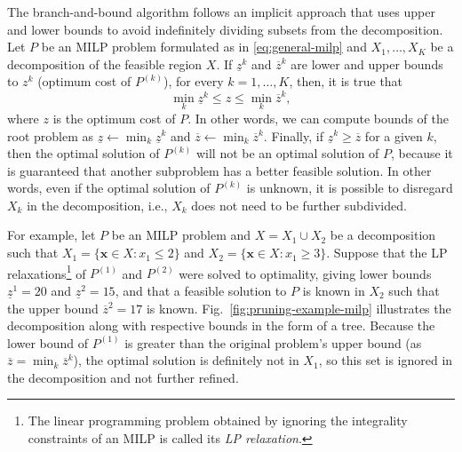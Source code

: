 The branch-and-bound algorithm follows an implicit approach that uses upper and lower bounds to avoid indefinitely dividing subsets from the decomposition.
Let $P$ be an MILP problem formulated as in \eqref{eq:general-milp} and $X_1,\ldots,X_K$ be a decomposition of the feasible region $X$.
If $\underline{z}^{k}$ and $\overline{z}^{k}$ are lower and upper bounds to $z^{k}$ (optimum cost of $P^{(k)}$), for every $k=1,\ldots,K$, then, it is true that \[
\min_k \underline{z}^{k} \le z \le \min_k \overline{z}^{k}
,\] 
where $z$ is the optimum cost of $P$.
In other words, we can compute bounds of the root problem as $\underline{z}\gets \min_k \underline{z}^{k}$ and $\overline{z}\gets \min_k \overline{z}^{k}$.
Finally, if $\underline{z}^{k} \ge \overline{z}$ for a given $k$, then the optimal solution of $P^{(k)}$ will not be an optimal solution of $P$, because it is guaranteed that another subproblem has a better feasible solution.
In other words, even if the optimal solution of $P^{(k)}$ is unknown, it is possible to disregard $X_k$ in the decomposition, i.e., $X_k$ does not need to be further subdivided. 

For example, let $P$ be an MILP problem and $X=X_1\cup X_2$ be a decomposition such that $X_1=\{\bm{x}\in X: x_1 \le 2\}$ and $X_2=\{\bm{x}\in X: x_1 \ge 3\}$.
Suppose that the LP relaxations\footnote{The linear programming problem obtained by ignoring the integrality constraints of an MILP is called its \emph{LP relaxation}.} of $P^{(1)}$ and $P^{(2)}$ were solved to optimality, giving lower bounds $\underline{z}^1=20$ and $\underline{z}^{2}=15$, and that a feasible solution to $P$ is known in $X_2$ such that the upper bound $\overline{z}^{2}=17$ is known.
Fig.~\ref{fig:pruning-example-milp} illustrates the decomposition along with respective bounds in the form of a tree.
Because the lower bound of $P^{(1)}$ is greater than the original problem's upper bound (as $\overline{z}=\min_k \overline{z}^{k}$), the optimal solution is definitely not in $X_1$, so this set is ignored in the decomposition and not further refined.

